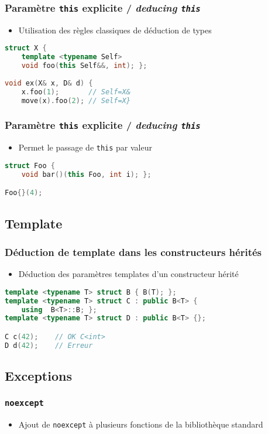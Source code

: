 \documentclass[C++.tex]{subfiles}
\begin{document}
\begin{frame}[fragile]
	\frametitle{Paramètre \lstinline|this| explicite / \textit{deducing \lstinline|this|}}
	\begin{itemize}
		\item Utilisation des règles classiques de déduction de types 
	\end{itemize}

	\begin{lstlisting}[language=C++]
struct X {
	template <typename Self>
	void foo(this Self&&, int); };
	
void ex(X& x, D& d) {
	x.foo(1);       // Self=X&
	move(x).foo(2); // Self=X}\end{lstlisting}
\end{frame}

\begin{frame}[fragile]
	\frametitle{Paramètre \lstinline|this| explicite / \textit{deducing \lstinline|this|}}
	\begin{itemize}
		\item Permet le passage de \lstinline|this| par valeur
	\end{itemize}

	\begin{lstlisting}[language=C++]
struct Foo {
	void bar()(this Foo, int i); };

Foo{}(4);\end{lstlisting}
\end{frame}

\subsection*{Template}
\begin{frame}[fragile]
	\frametitle{Déduction de template dans les constructeurs hérités}
	\begin{itemize}
		\item Déduction des paramètres templates d'un constructeur hérité
	\end{itemize}

	\begin{lstlisting}[language=C++]
template <typename T> struct B { B(T); };
template <typename T> struct C : public B<T> {
	using  B<T>::B; };
template <typename T> struct D : public B<T> {};

C c(42);	// OK C<int>
D d(42);	// Erreur\end{lstlisting}
\end{frame}

\subsection*{Exceptions}
\begin{frame}[fragile]
	\frametitle{\lstinline|noexcept|}
	\begin{itemize}
		\item Ajout de \lstinline|noexcept| à plusieurs fonctions de la bibliothèque standard
	\end{itemize}
\end{frame}
\end{document}
